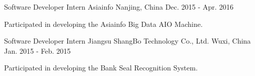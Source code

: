 

\begin{cventries}

  \cventry
    {Software Developer Intern} %
    {Asiainfo} %
    {Nanjing, China} %
    {Dec. 2015 - Apr. 2016} %
    {
      \begin{cvitems} %
        \item {Participated in developing the Asiainfo Big Data AIO Machine.}
      \end{cvitems}
    }

  \cventry
    {Software Developer Intern} %
    {Jiangsu ShangBo Technology Co., Ltd.} %
    {Wuxi, China} %
    {Jan. 2015 - Feb. 2015} %
    {
      \begin{cvitems} %
          \item {Participated in developing the Bank Seal Recognition System.}
      \end{cvitems}
    }

\end{cventries}